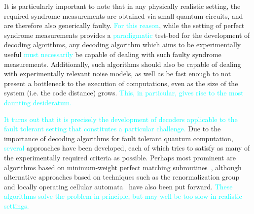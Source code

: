 \documentclass[twocolumn,preprintnumbers,amsmath,amssymb,notitlepage,nofootinbib,longbibliography,superscriptaddress,aps,pra,10pt]{revtex4-1}
\newcommand{\je}[1]{\textcolor{cyan}{#1}}
\begin{document}
	It is particularly important to note that in any physically realistic setting, the required syndrome measurements are obtained via small quantum circuits, and are therefore also generically faulty.
	\je{For this reason}, while the setting of perfect syndrome measurements provides a \je{paradigmatic}
	test-bed for the development of decoding algorithms, any decoding algorithm which aims to be experimentally useful
	\je{must necessarily}
	be capable of dealing with such faulty syndrome measurements.
	Additionally, such algorithms should also be capable of dealing with experimentally relevant noise models, as well as be fast enough to not present a bottleneck to the execution of computations, even as the size of the system (i.e. the code distance) grows. \je{This, in particular, gives rise to the most daunting desideratum.}

	\je{It turns out that it is precisely the development of decoders applicable to the fault tolerant setting that constitutes a particular challenge.}
	Due to the importance of decoding algorithms for fault tolerant quantum computation,
	\je{several}
	approaches have been developed, each of which tries to satisfy as many of the experimentally required criteria as possible.
	Perhaps most prominent are algorithms based on minimum-weight perfect matching subroutines~\cite{Fowler13}, although alternative approaches based on techniques such as the renormalization group~\cite{Duclos2010} and locally operating cellular automata~\cite{Herold15,herold2017cellular,Kubica2018} have also been put forward.
	\je{These algorithms solve the problem in principle, but may well be too slow in realistic settings.}
\end{document}
